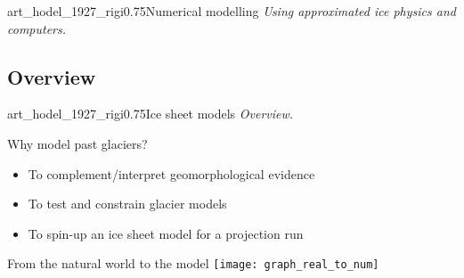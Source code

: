 

    \begin{sectionframe}{art_hodel_1927_rigi}{0.75}{Numerical modelling}
      \emph{Using approximated ice physics and computers.}
    \end{sectionframe}

\subsection{Overview}

    \begin{sectionframe}{art_hodel_1927_rigi}{0.75}{Ice sheet models}
      \emph{Overview.}
    \end{sectionframe}

    \begin{frame}{Why model past glaciers?}
      \begin{itemize}[<+->]
        \item To \alert{complement/interpret} geomorphological evidence
        \item To \alert{test and constrain} glacier models
        \item To \alert{spin-up} an ice sheet model for a projection run
      \end{itemize}
    \end{frame}

    \begin{frame}[label=real_to_num]{From the natural world to the model}
      \texttt{[image: graph\_real\_to\_num]}
    \end{frame}


